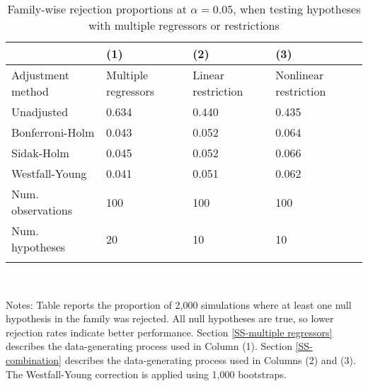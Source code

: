 \documentclass{article}
\begin{document}
\begin{table}[tbp] \centering
{}

\caption{Family-wise rejection proportions at \(\alpha = 0.05\), when testing hypotheses with multiple regressors or restrictions}
\label{tab:wyoung3}
\begin{tabularx}{\linewidth}{@{}lCCC@{}}

\toprule
&{(1)}&{(2)}&{(3)} \tabularnewline \midrule
{Adjustment method}&{Multiple regressors}&{Linear restriction}&{Nonlinear restriction} \tabularnewline
\midrule \addlinespace[\belowrulesep]
Unadjusted&0.634&0.440&0.435 \tabularnewline
Bonferroni-Holm&0.043&0.052&0.064 \tabularnewline
Sidak-Holm&0.045&0.052&0.066 \tabularnewline
Westfall-Young&0.041&0.051&0.062 \tabularnewline
\midrule Num. observations&100&100&100 \tabularnewline
Num. hypotheses&20&10&10 \tabularnewline
\bottomrule \addlinespace[\belowrulesep]

\end{tabularx}
\\ \parbox{\linewidth}{\footnotesize Notes: Table reports the proportion of 2,000 simulations where at least one null hypothesis in the family was rejected. All null hypotheses are true, so lower rejection rates indicate better performance. Section \ref{SS-multiple regressors} describes the data-generating process used in Column (1). Section \ref{SS-combination} describes the data-generating process used in Columns (2) and (3). The Westfall-Young correction is applied using 1,000 bootstraps.}
\end{table}
\end{document}
